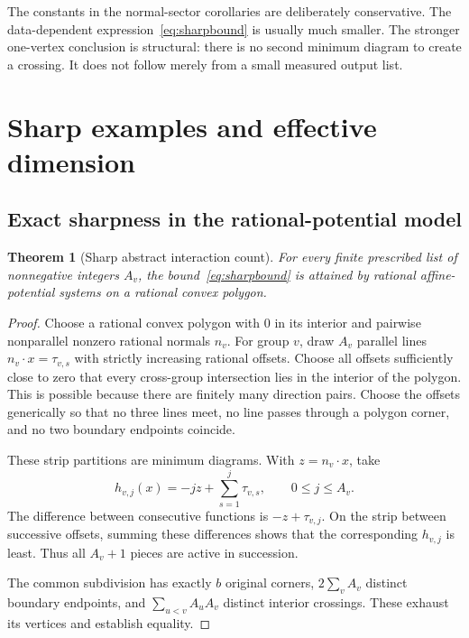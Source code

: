 \documentclass[11pt,letterpaper]{article}
\newtheorem{theorem}{Theorem}[section]
\theoremstyle{definition}
\theoremstyle{remark}\newtheorem{remark}[theorem]{Remark}
\begin{document}
The constants in the normal-sector corollaries are deliberately conservative.
The data-dependent expression~\eqref{eq:sharpbound} is usually much smaller.
The stronger one-vertex conclusion is structural: there is no second
minimum diagram to create a crossing. It does not follow merely from a
small measured output list.

\section{Sharp examples and effective dimension}
\label{sec:sharpness}

\subsection{Exact sharpness in the rational-potential model}

\begin{theorem}[Sharp abstract interaction count]
\label{thm:sharp}
For every finite prescribed list of nonnegative integers $A_v$, the
bound~\eqref{eq:sharpbound} is attained by rational affine-potential
systems on a rational convex polygon.
\end{theorem}

\begin{proof}
Choose a rational convex polygon with $0$ in its interior and pairwise
nonparallel nonzero rational normals $n_v$. For group $v$, draw $A_v$
parallel lines $n_v\cdot x=\tau_{v,s}$ with strictly increasing rational
offsets. Choose all offsets sufficiently close to zero that every
cross-group intersection lies in the interior of the polygon. This is
possible because there are finitely many direction pairs. Choose the
offsets generically so that no three lines meet, no line passes through a
polygon corner, and no two boundary endpoints coincide.

These strip partitions are minimum diagrams. With $z=n_v\cdot x$, take
\[
 h_{v,j}(x)=-jz+\sum_{s=1}^{j}\tau_{v,s},
 \qquad 0\le j\le A_v.
\]
The difference between consecutive functions is $-z+\tau_{v,j}$.
On the strip between successive offsets, summing these differences shows
that the corresponding $h_{v,j}$ is least. Thus all $A_v+1$ pieces are
active in succession.

The common subdivision has exactly $b$ original corners,
$2\sum_vA_v$ distinct boundary endpoints, and
$\sum_{u<v}A_uA_v$ distinct interior crossings. These exhaust its
vertices and establish equality.
\end{proof}
\end{document}
